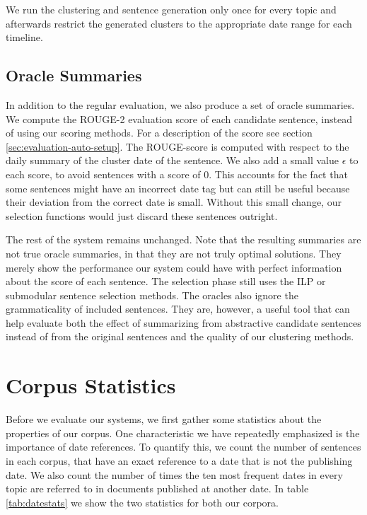 \documentclass[a4paper,BCOR=10mm]{report}
\numberwithin{lemma}{chapter}
\numberwithin{definition}{chapter}
\begin{document}
We run the clustering and sentence generation only once for every topic and afterwards restrict the generated clusters to the appropriate date range for each timeline.

\subsection{Oracle Summaries}

In addition to the regular evaluation, we also produce a set of oracle summaries. We compute the ROUGE-2 evaluation score of each candidate sentence, instead of using our scoring methods. For a description of the score see section \ref{sec:evaluation-auto-setup}. The ROUGE-score is computed with respect to the daily summary of the cluster date of the sentence. We also add a small value $\epsilon$ to each score, to avoid sentences with a score of 0. This accounts for the fact that some sentences might have an incorrect date tag but can still be useful because their deviation from the correct date is small. Without this small change, our selection functions would just discard these sentences outright.

The rest of the system remains unchanged. Note that the resulting summaries are not true oracle summaries, in that they are not truly optimal solutions. They merely show the performance our system could have with perfect information about the score of each sentence. The selection phase still uses the ILP or submodular sentence selection methods. The oracles also ignore the grammaticality of included sentences. They are, however, a useful tool that can help evaluate both the effect of summarizing from abstractive candidate sentences instead of from the original sentences and the quality of our clustering methods.



\section{Corpus Statistics} \label{sec:setup-stats}

Before we evaluate our systems, we first gather some statistics about the properties of our corpus.
One characteristic we have repeatedly emphasized is the importance of date references.
To quantify this, we count the number of sentences in each corpus, that have an exact reference to a date that is not the publishing date.
We also count the number of times the ten most frequent dates in every topic are referred to in documents published at another date.
In table \ref{tab:datestats} we show the two statistics for both our corpora.
\end{document}
